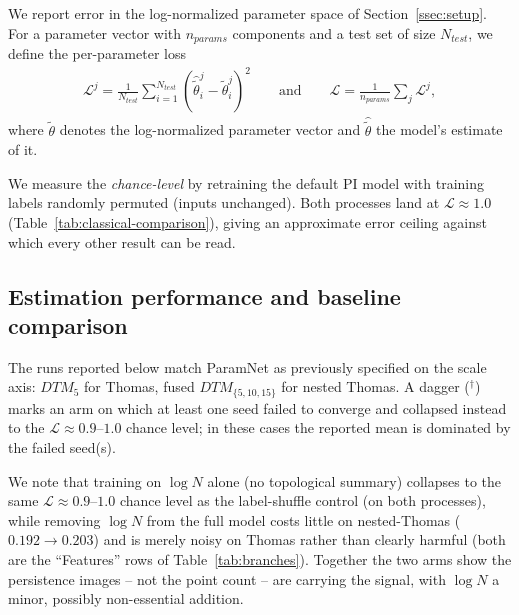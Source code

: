 \documentclass[11pt,a4paper]{article}
\theoremstyle{definitioncolon}
\begin{document}
We report error in the log-normalized
parameter space of Section~\ref{ssec:setup}. For a parameter vector with
$n_{params}$ components and a test set of size $N_{test}$, we define the
per-parameter loss
\begin{align*}
    \mathcal{L}^j = \frac{1}{N_{test}} \sum_{i=1}^{N_{test}}
    (\hat{\tilde\theta}^j_i - \tilde\theta^j_i)^2
    \qquad \text{and} \qquad
    \mathcal{L} = \frac{1}{n_{params}} \sum_j \mathcal{L}^j,
\end{align*}
where $\tilde\theta$ denotes the log-normalized parameter vector and
$\hat{\tilde\theta}$ the model's estimate of it.

We measure the \emph{chance-level} by retraining the default PI model with training
labels randomly permuted (inputs unchanged). Both processes land at
$\mathcal{L}\approx1.0$ (Table~\ref{tab:classical-comparison}), giving an approximate error ceiling against which every other result can be read.

\pagebreak
\subsection{Estimation performance and baseline comparison}
\label{ssec:results}

The runs reported below match ParamNet as previously specified on the scale axis: $DTM_5$ for Thomas, fused $DTM_{\{5,10,15\}}$ for nested Thomas. A dagger ($^\dagger$) marks an arm on which at least one seed failed to converge and collapsed instead to the $\mathcal{L}\approx0.9$--$1.0$ chance level; in these cases the reported mean is dominated by the failed seed(s).

We note that training on $\log N$ alone (no
topological summary) collapses to the same
$\mathcal{L}\approx0.9$--$1.0$ chance level as the label-shuffle control
(on both processes), while removing $\log N$ from the
full model costs little on nested-Thomas ($0.192\to0.203$) and is
merely noisy on Thomas rather than clearly harmful (both are the
``Features'' rows of Table~\ref{tab:branches}). Together the two
arms show the persistence images -- not the point count -- are carrying the
signal, with $\log N$ a minor, possibly non-essential addition.
\end{document}
